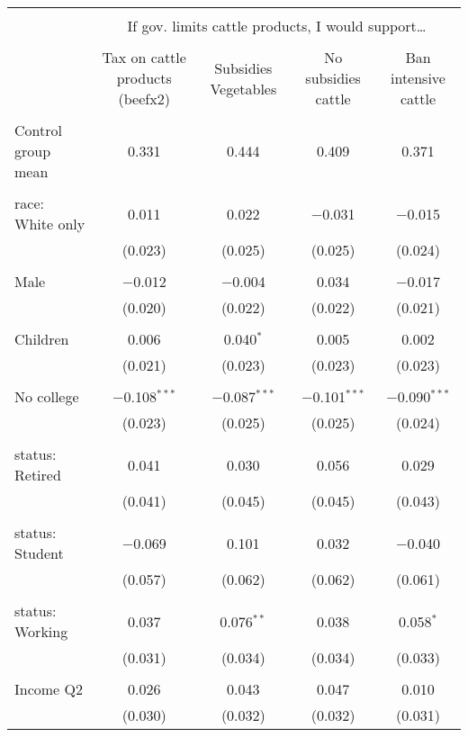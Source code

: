 
\begin{tabular}{@{\extracolsep{5pt}}lcccc} 
\\[-1.8ex]\hline 
\hline \\[-1.8ex] 
 & \multicolumn{4}{c}{If gov. limits cattle products, I would support…} \\ 
\cline{2-5} 
\\[-1.8ex] & Tax on cattle products (beefx2) & Subsidies Vegetables & No subsidies cattle & Ban intensive cattle \\ 
\hline \\[-1.8ex] 
 Control group mean & 0.331 & 0.444 & 0.409 & 0.371  \\ \hline \\[-1.8ex] race: White only & 0.011 & 0.022 & $-$0.031 & $-$0.015 \\ 
  & (0.023) & (0.025) & (0.025) & (0.024) \\ 
  & & & & \\ 
 Male & $-$0.012 & $-$0.004 & 0.034 & $-$0.017 \\ 
  & (0.020) & (0.022) & (0.022) & (0.021) \\ 
  & & & & \\ 
 Children & 0.006 & 0.040$^{*}$ & 0.005 & 0.002 \\ 
  & (0.021) & (0.023) & (0.023) & (0.023) \\ 
  & & & & \\ 
 No college & $-$0.108$^{***}$ & $-$0.087$^{***}$ & $-$0.101$^{***}$ & $-$0.090$^{***}$ \\ 
  & (0.023) & (0.025) & (0.025) & (0.024) \\ 
  & & & & \\ 
 status: Retired & 0.041 & 0.030 & 0.056 & 0.029 \\ 
  & (0.041) & (0.045) & (0.045) & (0.043) \\ 
  & & & & \\ 
 status: Student & $-$0.069 & 0.101 & 0.032 & $-$0.040 \\ 
  & (0.057) & (0.062) & (0.062) & (0.061) \\ 
  & & & & \\ 
 status: Working & 0.037 & 0.076$^{**}$ & 0.038 & 0.058$^{*}$ \\ 
  & (0.031) & (0.034) & (0.034) & (0.033) \\ 
  & & & & \\ 
 Income Q2 & 0.026 & 0.043 & 0.047 & 0.010 \\ 
  & (0.030) & (0.032) & (0.032) & (0.031) \\ 

\end{tabular}
